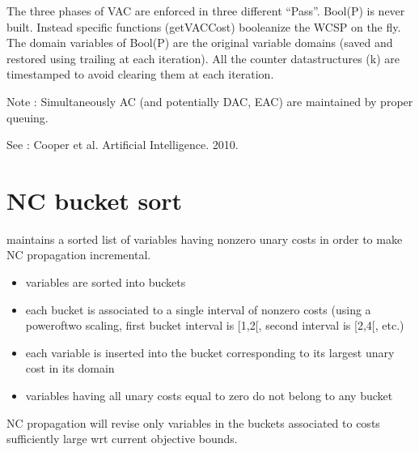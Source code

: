 \documentclass[letterpaper,10pt,openany,oneside,english]{sphinxmanual}
\begin{document}
\begin{fulllineitems}

\pysigstartsignatures
{}
\pysigstopsignatures
\sphinxAtStartPar
The three phases of VAC are enforced in three different “Pass”. Bool(P) is never built. Instead specific functions (getVACCost) booleanize the WCSP on the fly. The domain variables of Bool(P) are the original variable domains (saved and restored using trailing at each iteration). All the counter data\sphinxhyphen{}structures (k) are timestamped to avoid clearing them at each iteration.

\sphinxAtStartPar
Note : Simultaneously AC (and potentially DAC, EAC) are maintained by proper queuing.

\sphinxAtStartPar
See :  Cooper et al. Artificial Intelligence. 2010. 

\end{fulllineitems}



\section{NC bucket sort}
\label{\detokenize{ref/ref_modules:nc-bucket-sort}}

\begin{fulllineitems}

\pysigstartsignatures
{}
\pysigstopsignatures
\sphinxAtStartPar
maintains a sorted list of variables having non\sphinxhyphen{}zero unary costs in order to make NC propagation incremental.\begin{itemize}
\item {} 
\sphinxAtStartPar
variables are sorted into buckets

\item {} 
\sphinxAtStartPar
each bucket is associated to a single interval of non\sphinxhyphen{}zero costs (using a power\sphinxhyphen{}of\sphinxhyphen{}two scaling, first bucket interval is {[}1,2{[}, second interval is {[}2,4{[}, etc.)

\item {} 
\sphinxAtStartPar
each variable is inserted into the bucket corresponding to its largest unary cost in its domain

\item {} 
\sphinxAtStartPar
variables having all unary costs equal to zero do not belong to any bucket

\end{itemize}


\sphinxAtStartPar
NC propagation will revise only variables in the buckets associated to costs sufficiently large wrt current objective bounds. 

\end{fulllineitems}
\end{document}
